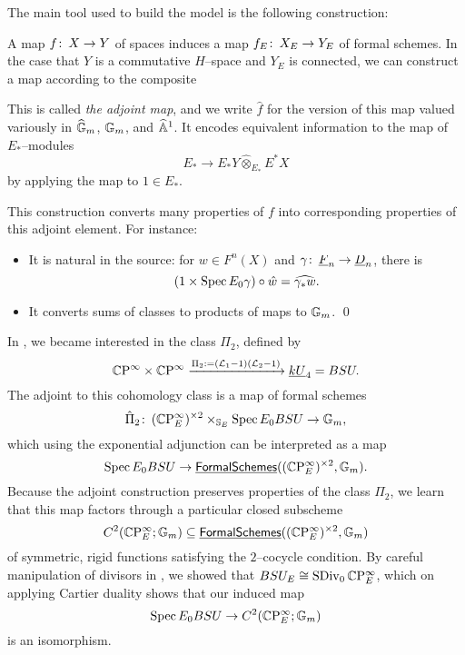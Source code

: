 The main tool used to build the model is the following construction:
\begin{definition}
A map $f\colon\thinspace X \to Y$ of spaces induces a map $f_E \colon\thinspace X_E \to Y_E$ of formal schemes.  In the case that $Y$ is a commutative $H$--space and $Y_E$ is connected, we can construct a map according to the composite
\begin{center}
\end{center}
This is called \textit{the adjoint map}, and we write $\hat f$ for the version of this map valued variously in $\widehat{\mathbb G}_m$, $\mathbb G_m$, and $\widehat{\mathbb{A}}^1$.  It encodes equivalent information to the map of $E_*$--modules \[E_* \to E_* Y \widehat\otimes_{E_*} E^* X\] by applying the map to $1 \in E_*$.
\end{definition}

\begin{lemma}
This construction converts many properties of $f$ into corresponding properties of this adjoint element.  For instance:
\begin{itemize}
\item It is natural in the source: for $w \in F^n(X)$ and $\gamma\colon\thinspace \underline{\smash{F}}_{n} \to \underline{\smash{D}}_{n}$, there is \[(1 \times \operatorname{Spec} E_0 \gamma) \circ \hat w = \widehat{\gamma_* w}.\]
\item It converts sums of classes to products of maps to $\mathbb G_m$.
\qed
\end{itemize}
\end{lemma}

In , we became interested in the class $\Pi_2$, defined by \[\mathbb{C}\mathrm P^\infty \times \mathbb{C}\mathrm P^\infty \xrightarrow{\Pi_2 := (\mathcal{L}_1 - 1)(\mathcal{L}_2 - 1)} \underline{\smash{kU}}_{4} = BSU.\]  The adjoint to this cohomology class is a map of formal schemes \[\hat \Pi_2\colon\thinspace (\mathbb{C}\mathrm P^\infty_E)^{\times 2} \times_{\mathbb S_E} \operatorname{Spec} E_0 BSU \to \mathbb G_m,\] which using the exponential adjunction can be interpreted as a map \[\operatorname{Spec} E_0 BSU \to \operatorname{\underline{\smash{\mathsf{FormalSchemes}}}}((\mathbb{C}\mathrm P^\infty_E)^{\times 2}, \mathbb G_m).\]  Because the adjoint construction preserves properties of the class $\Pi_2$, we learn that this map factors through a particular closed subscheme \[C^2(\mathbb{C}\mathrm P^\infty_E; \mathbb G_m) \subseteq \operatorname{\underline{\smash{\mathsf{FormalSchemes}}}}((\mathbb{C}\mathrm P^\infty_E)^{\times 2}, \mathbb G_m)\] of symmetric, rigid functions satisfying the $2$--cocycle condition.  By careful manipulation of divisors in , we showed that $BSU_E \cong \operatorname{SDiv}_0 \mathbb{C}\mathrm P^\infty_E$, which on applying Cartier duality shows that our induced map \[\operatorname{Spec} E_0 BSU \to C^2(\mathbb{C}\mathrm P^\infty_E; \mathbb G_m)\] is an isomorphism.

